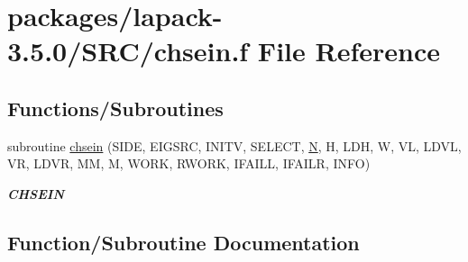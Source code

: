 \hypertarget{chsein_8f}{}\section{packages/lapack-\/3.5.0/\+S\+R\+C/chsein.f File Reference}
\label{chsein_8f}
\subsection*{Functions/\+Subroutines}
\begin{DoxyCompactItemize}
\item 
subroutine \hyperlink{chsein_8f_aecc09626a65806deba44066a7aab9860}{chsein} (S\+I\+D\+E, E\+I\+G\+S\+R\+C, I\+N\+I\+T\+V, S\+E\+L\+E\+C\+T, \hyperlink{polmisc_8c_a0240ac851181b84ac374872dc5434ee4}{N}, H, L\+D\+H, W, V\+L, L\+D\+V\+L, V\+R, L\+D\+V\+R, M\+M, M, W\+O\+R\+K, R\+W\+O\+R\+K, I\+F\+A\+I\+L\+L, I\+F\+A\+I\+L\+R, I\+N\+F\+O)
\begin{DoxyCompactList}\small\item\em {\bfseries C\+H\+S\+E\+I\+N} \end{DoxyCompactList}\end{DoxyCompactItemize}


\subsection{Function/\+Subroutine Documentation}
\hypertarget{chsein_8f_aecc09626a65806deba44066a7aab9860}{}
